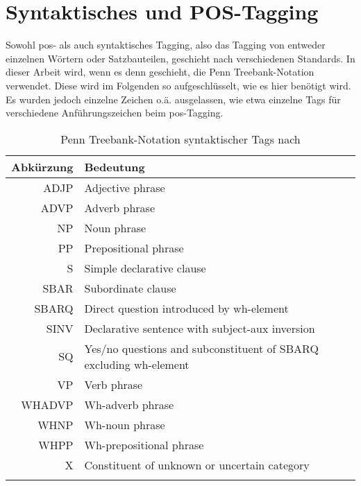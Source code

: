 \chapter{Syntaktisches und POS-Tagging}\label{ch:tagging}

Sowohl \ac{pos}- als auch syntaktisches Tagging, also das Tagging von entweder einzelnen Wörtern oder Satzbauteilen, geschieht nach verschiedenen Standards.
In dieser Arbeit wird, wenn es denn geschieht, die Penn Treebank-Notation verwendet.
Diese wird im Folgenden so aufgeschlüsselt, wie es hier benötigt wird.
Es wurden jedoch einzelne Zeichen o.ä. ausgelassen, wie etwa einzelne Tags für verschiedene Anführungszeichen beim \ac{pos}-Tagging.

\begin{longtable}{r p{10 cm}}
  \toprule
  Abkürzung & Bedeutung \\
  \midrule
  \endhead
  ADJP & Adjective phrase \\
  ADVP & Adverb phrase \\
  NP & Noun phrase \\
  PP & Prepositional phrase \\
  S & Simple declarative clause \\
  SBAR & Subordinate clause \\
  SBARQ & Direct question introduced by wh-element \\
  SINV & Declarative sentence with subject-aux inversion \\
  SQ & Yes/no questions and subconstituent of SBARQ excluding wh-element \\
  VP & Verb phrase \\
  WHADVP & Wh-adverb phrase \\
  WHNP & Wh-noun phrase \\
  WHPP & Wh-prepositional phrase \\
  X & Constituent of unknown or uncertain category \\
  \bottomrule
  \caption[Penn Treebank-Notation syntaktischer Tags]{Penn Treebank-Notation syntaktischer Tags nach \citet{penntreebankpos}}
  \label{tab:penntreebanksynt}
\end{longtable}

